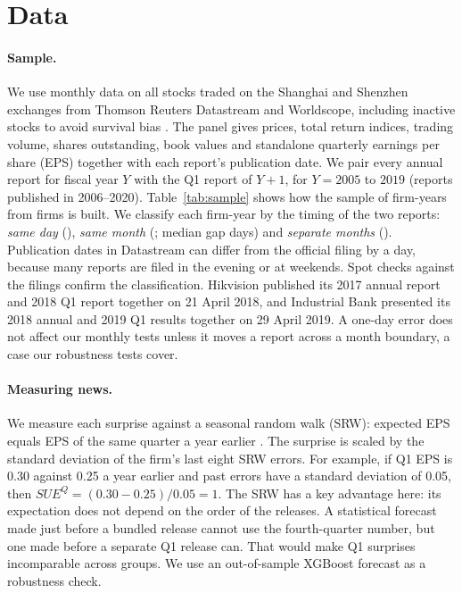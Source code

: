 \documentclass[11pt]{article}
\newcommand{\SUEQ}{SUE^{Q}}
\begin{document}
\section{Data}

\paragraph{Sample.} We use monthly data on all stocks traded on the Shanghai and Shenzhen exchanges from Thomson
Reuters Datastream and Worldscope, including inactive stocks to avoid survival bias \citep{shumway1997}. The panel
gives prices, total return indices, trading volume, shares outstanding, book values and standalone quarterly
earnings per share (EPS) together with each report's publication date. We pair every annual report for fiscal year
$Y$ with the Q1 report of $Y+1$, for $Y=2005$ to $2019$ (reports published in 2006--2020). Table~\ref{tab:sample}
shows how the sample of \NFirmYears{} firm-years from \NFirms{} firms is built. We classify each firm-year by the
timing of the two reports: \emph{same day} (\NSameDay), \emph{same month} (\NSameMonth; median gap \MedianGapSM{}
days) and \emph{separate months} (\NSeparate). Publication dates in Datastream can differ from the official filing
by a day, because many reports are filed in the evening or at weekends. Spot checks against the filings confirm the
classification. Hikvision published its 2017 annual report and 2018 Q1 report together on 21 April 2018, and
Industrial Bank presented its 2018 annual and 2019 Q1 results together on 29 April 2019. A one-day error does not
affect our monthly tests unless it moves a report across a month boundary, a case our robustness tests cover.

\paragraph{Measuring news.} We measure each surprise against a seasonal random walk (SRW): expected EPS equals EPS of
the same quarter a year earlier \citep{foster1977,bernard1990}. The surprise is scaled by the standard deviation of the
firm's last eight SRW errors. For example, if Q1 EPS is 0.30 against 0.25 a year earlier and past errors have a
standard deviation of 0.05, then $\SUEQ=(0.30-0.25)/0.05=1$. The SRW has a key advantage here: its expectation does
not depend on the order of the releases. A statistical forecast made just before a bundled release cannot use the
fourth-quarter number, but one made before a separate Q1 release can. That would make Q1 surprises incomparable
across groups. We use an out-of-sample XGBoost forecast \citep{chen2016} as a robustness check.
\end{document}
